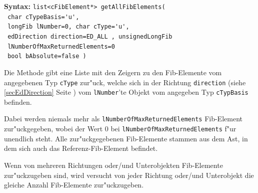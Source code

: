\textbf{Syntax:} \verb|list<cFibElement*> getAllFibElements(| \\\verb| char cTypeBasis='u',| \\\verb| longFib lNumber=0, char cType='u',| \\\verb| edDirection direction=ED_ALL , unsignedLongFib| \\\verb| lNumberOfMaxReturnedElements=0 | \\\verb| bool bAbsolute=false )|

\bigskip\noindent
Die Methode gibt eine Liste mit den Zeigern zu den Fib-Elemente vom angegebenen Typ \verb|cType| zur"uck, welche sich in der Richtung \verb|direction| (siehe \ref{secEdDirection} Seite \pageref{secEdDirection}) vom \verb|lNumber|'te Objekt vom angegeben Typ \verb|cTypBasis| befinden.

Dabei werden  niemals mehr als \verb|lNumberOfMaxReturnedElements| Fib-Element zur"uckgegeben, wobei der Wert $0$ bei \verb|lNumberOfMaxReturnedElements| f"ur unendlich steht. Alle zur"uckgegebenen Fib-Elemente stammen aus dem Ast, in dem sich auch das Referenz-Fib-Element befindet.

Wenn von mehreren Richtungen oder/und Unterobjekten Fib-Elemente zur"uckzugeben sind, wird versucht von jeder Richtung oder/und Unterobjekt die gleiche Anzahl Fib-Elemente zur"uckzugeben.

